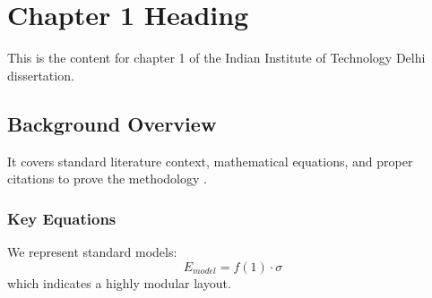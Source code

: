 \chapter{Chapter 1 Heading}
\label{ch:chapter1}
This is the content for chapter 1 of the Indian Institute of Technology Delhi dissertation.

\section{Background Overview}
It covers standard literature context, mathematical equations, and proper citations to prove the methodology \cite{texbook}.

\subsection{Key Equations}
We represent standard models:
\begin{equation}
    E_{model} = f(1) \cdot \sigma
\end{equation}
which indicates a highly modular layout.
